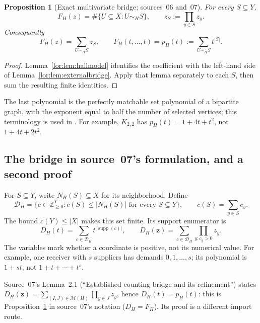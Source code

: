 \documentclass[11pt]{article}
\numberwithin{equation}{section}
\newtheorem{proposition}[theorem]{Proposition}
\theoremstyle{definition}
\newcommand{\Z}{\mathbb Z}
\newcommand{\supp}{\operatorname{supp}}
\newcommand{\PM}{\mathcal M}
\newcommand{\cD}{\mathcal D}
\begin{document}
\begin{proposition}[Exact multivariate bridge; sources~06 and~07]\label{lor:prop:bridge}
For every $S\subseteq Y$,
\begin{equation}
 [z_S]F_H(z)=\#\{U\subseteq X:U\sim_H S\},
 \qquad z_S:=\prod_{y\in S}z_y.
 \label{lor:eq:supportbridge}
\end{equation}
Consequently
\begin{equation}
 F_H(z)=\sum_{U\sim_H S}z_S,
 \qquad F_H(t,\ldots,t)=p_H(t):=\sum_{U\sim_H S}t^{|S|}.
 \label{lor:eq:FHmatching}
\end{equation}
\end{proposition}
\begin{proof}
Lemma~\ref{lor:lem:hallmodel} identifies the coefficient with the left-hand
side of Lemma~\ref{lor:lem:externalbridge}. Apply that lemma separately to each
$S$, then sum the resulting finite identities.
\end{proof}
The last polynomial is the perfectly matchable set polynomial of a
bipartite graph, with the exponent equal to half the number of selected
vertices; this terminology is used in \cite{DK}. For example, $K_{2,2}$
has $p_H(t)=1+4t+t^2$, not $1+4t+2t^2$.

\subsection{The bridge in source~07's formulation, and a second proof}
\label{lor:sec:sp:bridge}
For $S\subseteq Y$, write $N_H(S)\subseteq X$ for its neighborhood. Define
\begin{equation}
 \cD_H=\{c\in\Z_{\ge0}^{Y}:c(S)\le |N_H(S)|\text{ for every }S\subseteq Y\},
 \qquad c(S)=\sum_{y\in S}c_y.
 \label{lor:sp:eq:hall}
\end{equation}
The bound $c(Y)\le |X|$ makes this set finite. Its support enumerator is
\[
 D_H(t)=\sum_{c\in\cD_H}t^{|\supp(c)|},
 \qquad D_H(\mathbf z)=\sum_{c\in\cD_H}\prod_{y:c_y>0}z_y.
\]
The variables mark whether a coordinate is positive, not its numerical value.
For example, one receiver with $s$ suppliers has demands $0,1,\ldots,s$;
its polynomial is $1+st$, not $1+t+\cdots+t^s$.

Source~07's Lemma~2.1 (``Established counting bridge and its refinement'')
states $D_H(\mathbf z)=\sum_{(I,J)\in\PM(H)}\prod_{y\in J}z_y$, hence
$D_H(t)=p_H(t)$: this is Proposition~\ref{lor:prop:bridge} in source~07's
notation ($D_H=F_H$). Its proof is a different import route.
\end{document}
